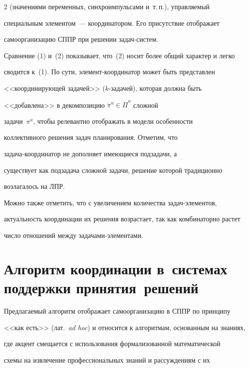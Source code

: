 \begin{multicols}{2}
(значениями переменных, синхроимпульсами и~т.\,п.), управляемый 


специальным элементом~--- координатором. Его присутствие отображает 


самоорганизацию СППР при решении за\-дач-сис\-тем.


  


  Сравнение (1) и~(2) показывает, что~(2) носит более общий характер и легко 


сводится к~(1). По сути, элемент-координатор может быть представлен 


<<координирующей задачей>> ($k$-за\-да\-чей), которая должна быть 


<<добавлена>> в декомпозицию $\dot{\pi}^u\in \dot{\Pi}^u$ сложной 


задачи~$\pi^u$, чтобы релевантно отображать в модели особенности 


коллективного решения задач планирования. Отметим, что 


  за\-да\-ча-ко\-ор\-ди\-на\-тор не дополняет имеющиеся подзадачи, а 


существует как подзадача сложной задачи, решение которой традиционно 


возлагалось на ЛПР.


  


  Можно также отметить, что с увеличением количества за\-дач-эле\-мен\-тов, 


актуальность координации их решения возрастает, так как комбинаторно растет 


число отношений между за\-да\-ча\-ми-эле\-мен\-тами.


  


\section{Алгоритм координации в~системах поддержки принятия~решений}


  


  Предлагаемый алгоритм отображает самоорганизацию в СППР по принципу 


<<как есть>> (лат.\ \textit{ad hoc}) и относится к алгоритмам, основанным на знаниях, 


где акцент смещается с использования формализованной математической 


схемы на извлечение профессиональных знаний и рассуждениям с их 



\end{multicols}
